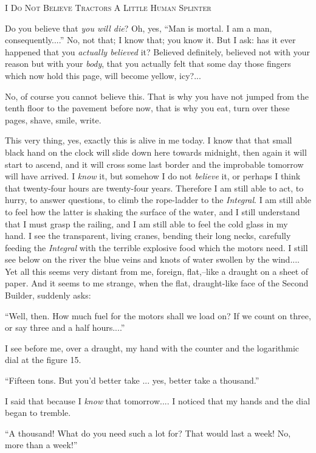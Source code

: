 \documentclass[11pt,openany]{book}
\begin{document}
\begin{center}\textsc{I Do Not Believe Tractors A Little Human Splinter}\end{center}

Do you believe that \emph{you will die}? Oh, yes, ``Man is mortal. I am a man, consequently....'' No, not that; I know that; you know it. But I ask: has it ever happened that you \emph{actually believed} it? Believed definitely, believed not with your reason but with your \emph{body}, that you actually felt that some day those fingers which now hold this page, will become yellow, icy?...

No, of course you cannot believe this. That is why you have not jumped from the tenth floor to the pavement before now, that is why you eat, turn over these pages, shave, smile, write.

This very thing, yes, exactly this is alive in me today. I know that that small black hand on the clock will slide down here towards midnight, then again it will start to ascend, and it will cross some last border and the improbable tomorrow will have arrived. I \emph{know} it, but somehow I do not \emph{believe} it, or perhaps I think that twenty-four hours are twenty-four years. Therefore I am still able to act, to hurry, to answer questions, to climb the rope-ladder to the \emph{Integral}. I am still able to feel how the latter is shaking the surface of the water, and I still understand that I must grasp the railing, and I am still able to feel the cold glass in my hand. I see the transparent, living cranes, bending their long necks, carefully feeding the \emph{Integral} with the terrible explosive food which the motors need. I still see below on the river the blue veins and knots of water swollen by the wind.... Yet all this seems very distant from me, foreign, flat,--like a draught on a sheet of paper. And it seems to me strange, when the flat, draught-like face of the Second Builder, suddenly asks:

``Well, then. How much fuel for the motors shall we load on? If we count on three, or say three and a half hours....''

I see before me, over a draught, my hand with the counter and the logarithmic dial at the figure 15.

``Fifteen tons. But you'd better take ... yes, better take a thousand.''

I said that because I \emph{know} that tomorrow.... I noticed that my hands and the dial began to tremble.

``A thousand! What do you need such a lot for? That would last a week! No, more than a week!''
\end{document}
